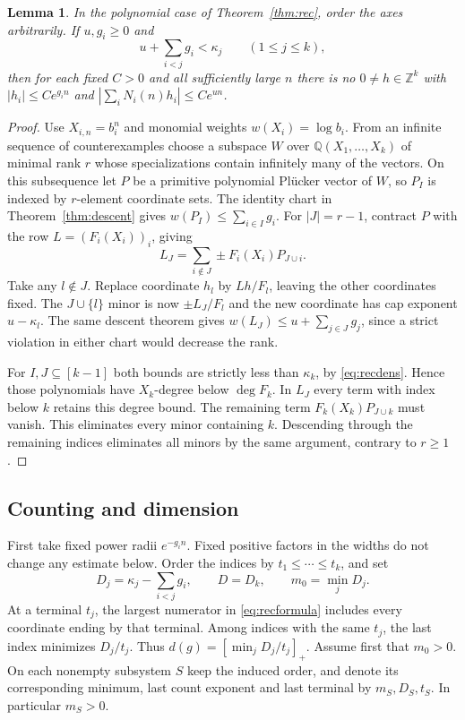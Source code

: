 \documentclass[11pt,a4paper,reqno]{amsart}
\newtheorem{lemma}[theorem]{Lemma}
\theoremstyle{definition}
\theoremstyle{remark}
\numberwithin{equation}{section}
\begin{document}
\begin{lemma}\label{lem:recdual}
In the polynomial case of Theorem~\ref{thm:rec}, order the axes arbitrarily. If \(u,g_i\ge0\) and
\begin{equation}\label{eq:recdens}
               u+\sum_{i<j}g_i<\kappa_j\qquad(1\le j\le k),
\end{equation}
then for each fixed \(C>0\) and all sufficiently large \(n\) there is no \(0\ne h\in\mathbb Z^k\) with \(|h_i|\le C e^{g_i n}\) and \(|\sum_iN_i(n)h_i|\le C e^{un}\).
\end{lemma}
\begin{proof}
Use \(X_{i,n}=b_i^n\) and monomial weights \(w(X_i)=\log b_i\). From an infinite sequence of counterexamples choose a subspace \(W\) over \(\mathbb Q(X_1,\ldots,X_k)\) of minimal rank \(r\) whose specializations contain infinitely many of the vectors. On this subsequence let \(P\) be a primitive polynomial Pl\"ucker vector of \(W\), so \(P_I\) is indexed by \(r\)-element coordinate sets. The identity chart in Theorem~\ref{thm:descent} gives \(w(P_I)\le\sum_{i\in I}g_i\). For \(|J|=r-1\), contract \(P\) with the row \(L=(F_i(X_i))_i\), giving
\[
                     L_J=\sum_{i\notin J}\pm F_i(X_i)P_{J\cup i}.
\]
Take any \(l\notin J\). Replace coordinate \(h_l\) by \(Lh/F_l\), leaving the other coordinates fixed. The \(J\cup\{l\}\) minor is now \(\pm L_J/F_l\) and the new coordinate has cap exponent \(u-\kappa_l\). The same descent theorem gives \(w(L_J)\le u+\sum_{j\in J}g_j\), since a strict violation in either chart would decrease the rank.

For \(I,J\subseteq[k-1]\) both bounds are strictly less than \(\kappa_k\), by \eqref{eq:recdens}. Hence those polynomials have \(X_k\)-degree below \(\deg F_k\). In \(L_J\) every term with index below \(k\) retains this degree bound. The remaining term \(F_k(X_k)P_{J\cup k}\) must vanish. This eliminates every minor containing \(k\). Descending through the remaining indices eliminates all minors by the same argument, contrary to \(r\ge1\).
\end{proof}

\subsection{Counting and dimension}
First take fixed power radii \(e^{-g_i n}\). Fixed positive factors in the widths do not change any estimate below. Order the indices by \(t_1\le\cdots\le t_k\), and set
\[
           D_j=\kappa_j-\sum_{i<j} g_i,\qquad D=D_k,\qquad m_0=\min_jD_j .
\]
At a terminal \(t_j\), the largest numerator in \eqref{eq:recformula} includes every coordinate ending by that terminal. Among indices with the same \(t_j\), the last index minimizes \(D_j/t_j\). Thus \mbox{\(d(g)=[\min_j D_j/t_j]_+\)}. Assume first that \(m_0>0\). On each nonempty subsystem \(S\) keep the induced order, and denote its corresponding minimum, last count exponent and last terminal by \(m_S,D_S,t_S\). In particular \(m_S>0\).
\end{document}
